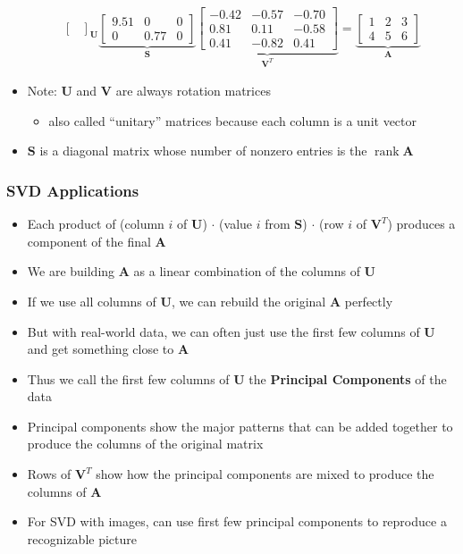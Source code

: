 \documentclass[letterpaper,12pt]{article}
\newcommand{\matr}[1]{\mathbf{#1}}
\DeclareMathOperator{\rank}{rank}
\begin{document}
\begin{itemize}
\begin{align}
{\begin{bmatrix}
         \end{bmatrix}}_{\matr{U}}
        \underbrace{\begin{bmatrix}
          9.51 & 0    & 0 \\
          0    & 0.77 & 0
         \end{bmatrix}}_{\matr{S}}
        \underbrace{\begin{bmatrix}
          -0.42 & -0.57 & -0.70 \\
          0.81  & 0.11  & -0.58 \\
          0.41  & -0.82 & 0.41
         \end{bmatrix}}_{\matr{V}^T}
        = \underbrace{\begin{bmatrix}
          1 & 2 & 3 \\
          4 & 5 & 6
         \end{bmatrix}}_{\matr{A}}
       \end{align}
 \item Note: $\matr{U}$ and $\matr{V}$ are always rotation matrices
       \begin{itemize}
        \item also called ``unitary'' matrices because each column is a unit vector
       \end{itemize}
 \item $\matr{S}$ is a diagonal matrix whose number of nonzero entries is the $\rank{\matr{A}}$
\end{itemize}


\subsubsection{SVD Applications}
\begin{itemize}
 \item Each product of (column $i$ of $\matr{U}$) $\cdot$ (value $i$ from $\matr{S}$) $\cdot$ (row $i$ of $\matr{V}^T$) produces a component of the final $\matr{A}$
 \item We are building $\matr{A}$ as a linear combination of the columns of $\matr{U}$
 \item If we use all columns of $\matr{U}$, we can rebuild the original $\matr{A}$ perfectly
 \item But with real-world data, we can often just use the first few columns of $\matr{U}$ and get something close to $\matr{A}$
 \item Thus we call the first few columns of $\matr{U}$ the \textbf{Principal Components} of the data
 \item Principal components show the major patterns that can be added together to produce the columns of the original matrix
 \item Rows of $\matr{V}^T$ show how the principal components are mixed to produce the columns of $\matr{A}$
 \item For SVD with images, can use first few principal components to reproduce a recognizable picture
\end{itemize}
\end{document}
